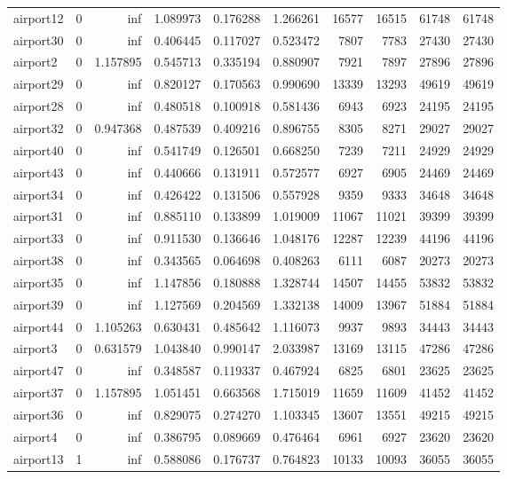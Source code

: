 \begin{longtable}{|l|r|r|r|r|r|r|r|r|r|}
airport12 & 0 & inf & 1.089973 & 0.176288 & 1.266261 & 16577 & 16515 & 61748 & 61748 \\
airport30 & 0 & inf & 0.406445 & 0.117027 & 0.523472 & 7807 & 7783 & 27430 & 27430 \\
airport2 & 0 & 1.157895 & 0.545713 & 0.335194 & 0.880907 & 7921 & 7897 & 27896 & 27896 \\
airport29 & 0 & inf & 0.820127 & 0.170563 & 0.990690 & 13339 & 13293 & 49619 & 49619 \\
airport28 & 0 & inf & 0.480518 & 0.100918 & 0.581436 & 6943 & 6923 & 24195 & 24195 \\
airport32 & 0 & 0.947368 & 0.487539 & 0.409216 & 0.896755 & 8305 & 8271 & 29027 & 29027 \\
airport40 & 0 & inf & 0.541749 & 0.126501 & 0.668250 & 7239 & 7211 & 24929 & 24929 \\
airport43 & 0 & inf & 0.440666 & 0.131911 & 0.572577 & 6927 & 6905 & 24469 & 24469 \\
airport34 & 0 & inf & 0.426422 & 0.131506 & 0.557928 & 9359 & 9333 & 34648 & 34648 \\
airport31 & 0 & inf & 0.885110 & 0.133899 & 1.019009 & 11067 & 11021 & 39399 & 39399 \\
airport33 & 0 & inf & 0.911530 & 0.136646 & 1.048176 & 12287 & 12239 & 44196 & 44196 \\
airport38 & 0 & inf & 0.343565 & 0.064698 & 0.408263 & 6111 & 6087 & 20273 & 20273 \\
airport35 & 0 & inf & 1.147856 & 0.180888 & 1.328744 & 14507 & 14455 & 53832 & 53832 \\
airport39 & 0 & inf & 1.127569 & 0.204569 & 1.332138 & 14009 & 13967 & 51884 & 51884 \\
airport44 & 0 & 1.105263 & 0.630431 & 0.485642 & 1.116073 & 9937 & 9893 & 34443 & 34443 \\
airport3 & 0 & 0.631579 & 1.043840 & 0.990147 & 2.033987 & 13169 & 13115 & 47286 & 47286 \\
airport47 & 0 & inf & 0.348587 & 0.119337 & 0.467924 & 6825 & 6801 & 23625 & 23625 \\
airport37 & 0 & 1.157895 & 1.051451 & 0.663568 & 1.715019 & 11659 & 11609 & 41452 & 41452 \\
airport36 & 0 & inf & 0.829075 & 0.274270 & 1.103345 & 13607 & 13551 & 49215 & 49215 \\
airport4 & 0 & inf & 0.386795 & 0.089669 & 0.476464 & 6961 & 6927 & 23620 & 23620 \\
airport13 & 1 & inf & 0.588086 & 0.176737 & 0.764823 & 10133 & 10093 & 36055 & 36055 \\

\end{longtable}
